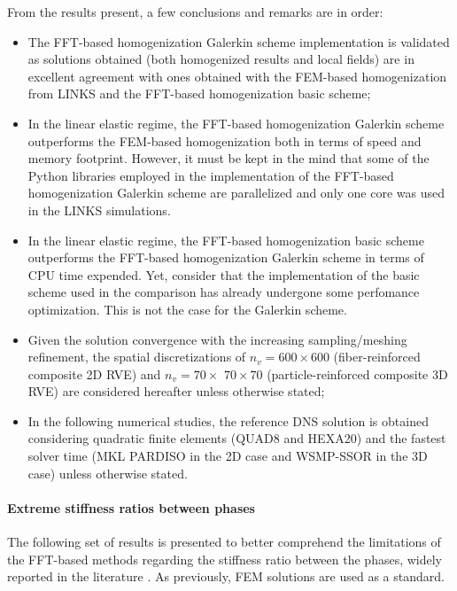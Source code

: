 From the results present, a few conclusions and remarks are in order:
\begin{itemize}
  \item The FFT-based homogenization Galerkin scheme implementation is validated as solutions obtained (both homogenized results and local fields) are in excellent agreement with ones obtained with the FEM-based homogenization from LINKS and the FFT-based homogenization basic scheme;
  \item In the linear elastic regime, the FFT-based homogenization Galerkin scheme outperforms the FEM-based homogenization both in terms of speed and memory footprint.
  However, it must be kept in the mind that some of the Python libraries employed in the implementation of the FFT-based homogenization Galerkin scheme are parallelized and only one core was used in the LINKS simulations.
  \item In the linear elastic regime, the FFT-based homogenization basic scheme outperforms the FFT-based homogenization Galerkin scheme in terms of CPU time expended.
  Yet, consider that the implementation of the basic scheme used in the comparison \cite{} has already undergone some perfomance optimization.
  This is not the case for the Galerkin scheme.
  \item Given the solution convergence with the increasing sampling/meshing refinement, the spatial discretizations of \(n_{v}=600 \times 600\) (fiber-reinforced composite 2D RVE) and \(n_{v}=70 \times\) \(70 \times 70\) (particle-reinforced composite 3D RVE) are considered hereafter unless otherwise stated;
  \item In the following numerical studies, the reference DNS solution is obtained considering quadratic finite elements (QUAD8 and HEXA20) and the fastest solver time (MKL PARDISO in the 2D case and WSMP-SSOR in the \(3 \mathrm{D}\) case) unless otherwise stated.
\end{itemize}

\FloatBarrier

\paragraph{Extreme stiffness ratios between phases}

The following set of results is presented to better comprehend the limitations of the FFT-based methods regarding the stiffness ratio between the phases, widely reported in the literature \cite{}.
As previously, FEM solutions are used as a standard.

